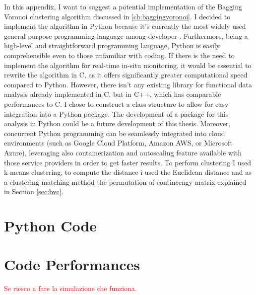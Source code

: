 In this appendix, I want to suggest a potential implementation of the Bagging Voronoi clustering algorithm discussed in \ref{ch:baggingvoronoi}. I decided to implement the algorithm in Python because it's currently the most widely used general-purpose programming language among developer \cite{lionel_sujay_vailshery_most_2023}. Furthermore, being a high-level and straightforward programming language, Python is easily comprehensible even to those unfamiliar with coding. If there is the need to implement the algorithm for real-time in-situ monitoring, it would be essential to rewrite the algorithm in C, as it offers significantly greater computational speed compared to Python. However, there isn't any existing library for functional data analysis already implemented in C, but in C++, which has comparable performances to C. I chose to construct a class structure to allow for easy integration into a Python package. The development of a package for this analysis in Python could be a future development of this thesis. Moreover, concurrent Python programming can be seamlessly integrated into cloud environments (such as Google Cloud Platform, Amazon AWS, or Microsoft Azure), leveraging also containerization and autoscaling feature available with those service providers in order to get faster results. To perform clustering I used k-means clustering, to compute the distance i used the Euclidean distance and as a clustering matching method the permutation of contincengy matrix explained in Section \ref{sec:bvc}.
\section{Python Code}
%

\section{Code Performances}
\textcolor{red}{Se riesco a fare la simulazione che funziona.}